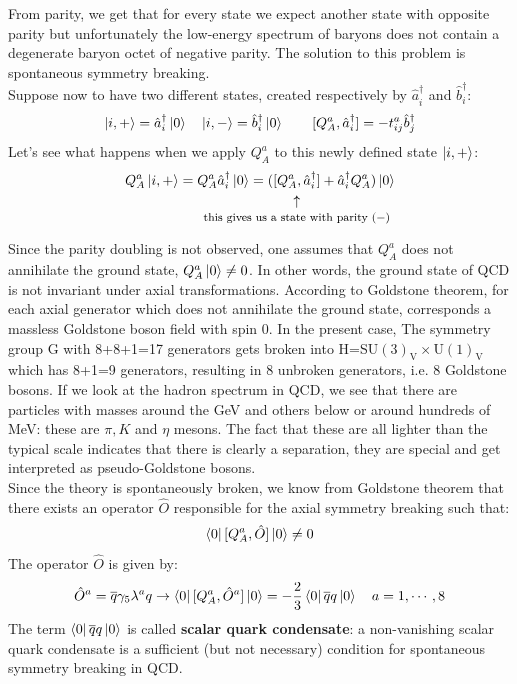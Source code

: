 \documentclass[../main.tex]{subfiles}
\begin{document}
From parity, we get that for every state we expect another state with opposite parity but unfortunately the low-energy spectrum of baryons does not contain a degenerate baryon octet of negative parity. The solution to this problem is spontaneous symmetry breaking.\\
Suppose now to have two different states, created respectively by $\hat{a}_i^\dagger$ and $\hat{b}_i^\dagger$:
\[
\ket{i,+}=\hat{a}_i^\dagger\ket{0} \quad \ket{i,-}=\hat{b}_i^\dagger\ket{0} \qquad [Q_A^a,\hat{a}_i^\dagger]=-t^a_{ij}\hat{b}_j^\dagger
\]
Let's see what happens when we apply $Q_A^a$ to this newly defined state $\ket{i,+}$:
\[
Q_A^a\ket{i,+}=Q_A^a\hat{a}_i^\dagger\ket{0}=(\underset{\mathclap{\tikz \node {$\uparrow$} node [below=1ex] {\footnotesize this gives us a state with parity $(-)$ };}}
{[Q_A^a,\hat{a}_i^\dagger]}+\hat{a}_i^\dagger Q_A^a)\ket{0}
\]
Since the parity doubling is not observed, one assumes that $Q_A^a$ does not annihilate the ground state, $Q_A^a\ket{0}\neq0$. In other words, the ground state of QCD is not invariant under axial transformations. According to Goldstone theorem, for each axial generator which does
not annihilate the ground state, corresponds a massless Goldstone boson field with spin 0. In the present case, The symmetry group G with 8+8+1=17 generators gets broken into H=SU$(3)_{\text{V}}\times$U$(1)_{\text{V}}$ which has 8+1=9 generators, resulting in 8 unbroken generators, i.e. 8 Goldstone bosons.
If we look at the hadron spectrum in QCD, we see that there are particles with masses around the GeV and others below or around hundreds of MeV: these are $\pi, K$ and $\eta$ mesons. The fact that these are all lighter than the typical scale indicates that there is clearly a separation, they are special and get interpreted as pseudo-Goldstone bosons.\\
Since the theory is spontaneously broken, we know from Goldstone theorem that there exists an operator $\hat{O}$ responsible for the axial symmetry breaking such that:
\[
\bra{0}[Q_A^a,\hat{O}]\ket{0}\neq0
\]
The operator $\hat{O}$ is given by:
\[
\hat{O}^a=\overline{q}\gamma_5\lambda^a q\to\bra{0}[Q_A^a,\hat{O}^a]\ket{0}=-\frac{2}{3}\bra{0}\overline{q}q\ket{0} \quad a=1,\cdots,8
\]
The term $\bra{0}\overline{q}q\ket{0}$ is called \textbf{scalar quark condensate}: a non-vanishing scalar quark condensate is a sufficient (but not necessary) condition for spontaneous symmetry breaking in QCD.
\end{document}
